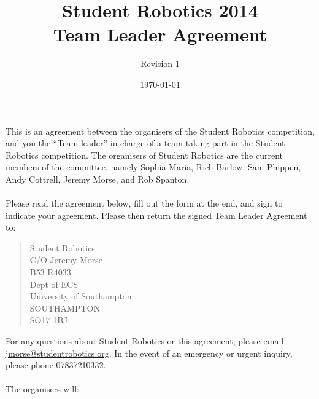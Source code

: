 \documentclass[a4paper, 11pt]{scrartcl}
\title {Student Robotics 2014\\ Team Leader Agreement}
\author{Revision 1}
\date{\today}
\begin{document}
\maketitle

This is an agreement between the organisers of the Student Robotics
competition, and you the ``Team leader'' in charge of a team taking part
in the Student Robotics competition. The organisers of Student Robotics are
the current members of the committee, namely Sophia Maria, Rich Barlow,
Sam Phippen, Andy Cottrell, Jeremy Morse, and Rob Spanton.

\paragraph{}

Please read the agreement below, fill out the form at the end, and sign to
indicate your agreement. Please then return the signed Team Leader Agreement to:
\begin{quote}
	Student Robotics \\
	C/O Jeremy Morse \\
	B53 R4033 \\
	Dept of ECS \\
	University of Southampton \\
	SOUTHAMPTON \\
	SO17 1BJ
\end{quote}

For any questions about Student Robotics or this agreement, please email
\url{jmorse@studentrobotics.org}. In the event of an emergency or urgent
inquiry, please phone 07837210332.

\paragraph{}

The organisers will:
\end{document}
